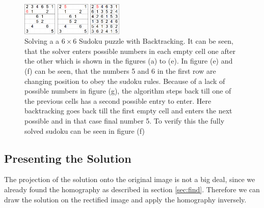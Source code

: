 \documentclass[
a4paper,     %
12pt         %
]{scrartcl}  %
\begin{document}
\begin{figure}[h!btp]
     \begin{minipage}[h]{1.62cm}
       \includegraphics[height=1.55cm]{imgs/backtracking7.png}
       \subcaption{}
     \end{minipage}     
     \begin{minipage}[h]{1.62cm}
       \includegraphics[height=1.55cm]{imgs/backtracking8.png}       
       \subcaption{}
     \end{minipage}     
     \begin{minipage}[h]{1.62cm}
       \includegraphics[height=1.55cm]{imgs/backtracking9.png}
       \subcaption{}
     \end{minipage}     
      \caption[Solving a $6 \times 6$ Sudoku puzzle with Backtracking]{\scriptsize{Solving a a $6 \times 6$ Sudoku puzzle with Backtracking. 
        It can be seen, that the solver enters possible numbers in each empty cell one after the other which is shown in 
        the figures (a) to (e). In figure (e) and (f) can be seen, that the numbers 5 and 6 in the first row are 
        changing position to obey the sudoku rules. Because of a lack of possible numbers in figure (g), the algorithm steps
        back till one of the previous cells has a second possible entry to enter. Here backtracking goes back till the first
        empty cell and enters the next possible and in that case final number 5. To verify this the fully solved sudoku can be
        seen in figure (f)}}
   \label{fig:backtracking}
\end{figure} 

\subsection{Presenting the Solution}

The projection of the solution onto the original image is not a big deal, since we already
found the homography as described in section \ref{sec:find}. Therefore we can draw the solution
on the rectified image and apply the homography inversely.
\end{document}
